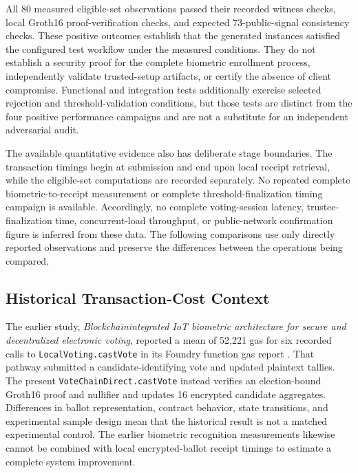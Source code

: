 All 80 measured eligible-set observations passed their recorded witness checks, local Groth16 proof-verification checks, and expected 73-public-signal consistency checks. These positive outcomes establish that the generated instances satisfied the configured test workflow under the measured conditions. They do not establish a security proof for the complete biometric enrollment process, independently validate trusted-setup artifacts, or certify the absence of client compromise. Functional and integration tests additionally exercise selected rejection and threshold-validation conditions, but those tests are distinct from the four positive performance campaigns and are not a substitute for an independent adversarial audit.

The available quantitative evidence also has deliberate stage boundaries. The transaction timings begin at submission and end upon local receipt retrieval, while the eligible-set computations are recorded separately. No repeated complete biometric-to-receipt measurement or complete threshold-finalization timing campaign is available. Accordingly, no complete voting-session latency, trustee-finalization time, concurrent-load throughput, or public-network confirmation figure is inferred from these data. The following comparisons use only directly reported observations and preserve the differences between the operations being compared.

\subsection{Historical Transaction-Cost Context}
\label{subsec:discussion-historical-cost}

The earlier study, \emph{Blockchain\textendash{}integrated IoT biometric architecture for secure and decentralized electronic voting}, reported a mean of 52,221 gas for six recorded calls to \texttt{LocalVoting.castVote} in its Foundry function gas report \citep{rifat2026biometric}. That pathway submitted a candidate-identifying vote and updated plaintext tallies. The present \texttt{VoteChainDirect.castVote} instead verifies an election-bound Groth16 proof and nullifier and updates 16 encrypted candidate aggregates. Differences in ballot representation, contract behavior, state transitions, and experimental sample design mean that the historical result is not a matched experimental control. The earlier biometric recognition measurements likewise cannot be combined with local encrypted-ballot receipt timings to estimate a complete system improvement.

